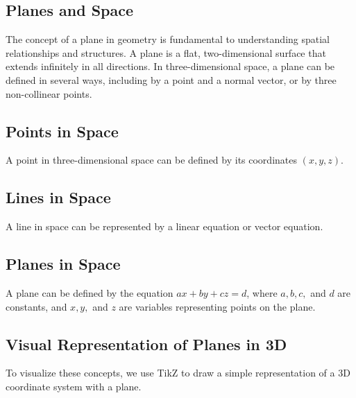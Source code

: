 \documentclass[a4paper,12pt]{book}
\begin{document}
\subsection{Planes and Space}
\label{subsec:planes_and_space}

The concept of a plane in geometry is fundamental to understanding spatial relationships and structures. A plane is a flat, two-dimensional surface that extends infinitely in all directions. In three-dimensional space, a plane can be defined in several ways, including by a point and a normal vector, or by three non-collinear points.

\subsection{Points in Space}
A point in three-dimensional space can be defined by its coordinates \((x, y, z)\).

\subsection{Lines in Space}
A line in space can be represented by a linear equation or vector equation.

\subsection{Planes in Space}
A plane can be defined by the equation \(ax + by + cz = d\), where \(a, b, c,\) and \(d\) are constants, and \(x, y,\) and \(z\) are variables representing points on the plane.

\subsection{Visual Representation of Planes in 3D}
To visualize these concepts, we use TikZ to draw a simple representation of a 3D coordinate system with a plane.

\begin{center}
\end{center}
\end{document}
